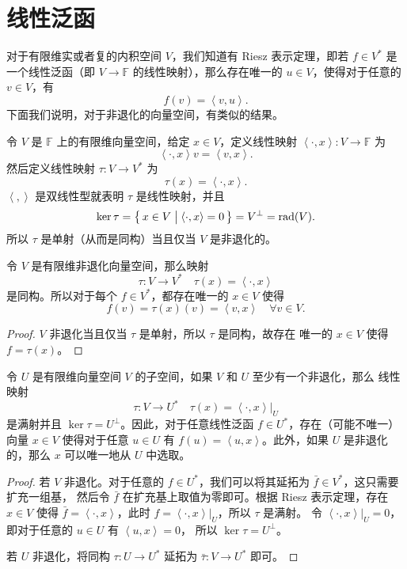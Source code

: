 \documentclass[fontset=none,zihao=-4]{Notes}
\DeclareMathOperator\rad{rad}
\newcommand{\inn}[1]{\left\langle#1\right\rangle}
\begin{document}
\section{线性泛函}

对于有限维实或者复的内积空间 $V$，我们知道有 Riesz 表示定理，即若 $f\in V^*$
是一个线性泛函（即 $V\to\mathbb{F}$ 的线性映射），那么存在唯一的 $u\in V$，使得对于任意的
$v\in V$，有
\[
  f(v)=\inn{v,u}.  
\]
下面我们说明，对于非退化的向量空间，有类似的结果。

令 $V$ 是 $\mathbb{F}$ 上的有限维向量空间，给定 $x\in V$，定义线性映射 $\inn{\cdot,x}:V\to\mathbb{F}$
为
\[
  \inn{\cdot,x}v=\inn{v,x}.  
\]
然后定义线性映射 $\tau:V\to V^*$ 为 
\[
  \tau(x)=\inn{\cdot, x}.  
\]
$\inn{,}$ 是双线性型就表明 $\tau$ 是线性映射，并且
\[
  \ker\tau=\bigl\{\,x\in V \bigm| \inn{\cdot,x}=0\,\bigr\}  
  =V^\bot=\rad(V).
\]
所以 $\tau$ 是单射（从而是同构）当且仅当 $V$ 是非退化的。

\begin{theorem}
  令 $V$ 是有限维非退化向量空间，那么映射
  \[
    \tau:V\to V^*\quad \tau(x)=\inn{\cdot,x}  
  \]
  是同构。所以对于每个 $f\in V^*$，都存在唯一的 $x\in V$ 使得
  \[
    f(v)=\tau(x)(v)=\inn{v, x}  \quad \forall v\in V.
  \]
\end{theorem}
\begin{proof}
  $V$ 非退化当且仅当 $\tau$ 是单射，所以 $\tau$ 是同构，故存在
  唯一的 $x\in V$ 使得 $f=\tau(x)$。
\end{proof}

\begin{theorem}\label{thm:Riesz for subspace}
  令 $U$ 是有限维向量空间 $V$ 的子空间，如果 $V$ 和 $U$ 至少有一个非退化，那么
  线性映射
  \[
      \tau:V\to U^*\quad \tau(x)=\inn{\cdot, x}|_U
  \]
  是满射并且 $\ker\tau=U^\bot$。因此，对于任意线性泛函 $f\in U^*$，存在（可能不唯一）
  向量 $x\in V$ 使得对于任意 $u\in U$ 有 $f(u)=\inn{u,x}$。此外，如果 $U$
  是非退化的，那么 $x$ 可以唯一地从 $U$ 中选取。
\end{theorem}
\begin{proof}
  若 $V$ 非退化。对于任意的 $f\in U^*$，我们可以将其延拓为 $\bar f\in V^*$，这只需要扩充一组基，
  然后令 $\bar f$ 在扩充基上取值为零即可。根据 Riesz 表示定理，存在 $x\in V$ 使得
  $\bar f=\inn{\cdot,x}$，此时 $f=\inn{\cdot,x}|_U$，所以 $\tau$ 是满射。
  令 $\inn{\cdot,x}|_U=0$，即对于任意的 $u\in U$ 有 $\inn{u,x}=0$，
  所以 $\ker\tau=U^\bot$。

  若 $U$ 非退化，将同构 $\tau:U\to U^*$ 延拓为 $\bar\tau:V\to U^*$ 即可。
\end{proof}
\end{document}
